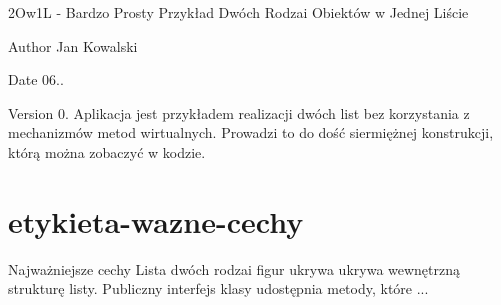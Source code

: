 2\+Ow1\+L -\/ Bardzo Prosty Przykład Dwóch Rodzai Obiektów w Jednej Liście \begin{DoxyAuthor}{Author}
Jan Kowalski 
\end{DoxyAuthor}
\begin{DoxyDate}{Date}
06.. 
\end{DoxyDate}
\begin{DoxyVersion}{Version}
0. Aplikacja jest przykładem realizacji dwóch list bez korzystania z mechanizmów metod wirtualnych. Prowadzi to do dość siermiężnej konstrukcji, którą można zobaczyć w kodzie. 
\end{DoxyVersion}
\hypertarget{index_etykieta-wazne-cechy}{}\section{etykieta-\/wazne-\/cechy}\label{index_etykieta-wazne-cechy}
Najważniejsze cechy Lista dwóch rodzai figur ukrywa ukrywa wewnętrzną strukturę listy. Publiczny interfejs klasy udostępnia metody, które ... 